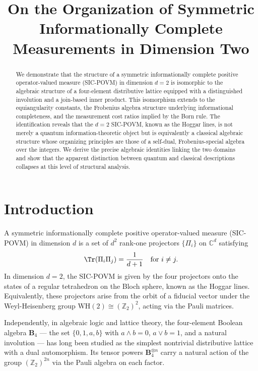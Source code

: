\documentclass{article}
\title{On the Organization of Symmetric Informationally Complete Measurements in Dimension Two}
\author{}
\date{}
\begin{document}
\maketitle

\begin{abstract}
We demonstrate that the structure of a symmetric informationally complete positive operator-valued measure (SIC-POVM) in dimension $d=2$ is isomorphic to the algebraic structure of a four-element distributive lattice equipped with a distinguished involution and a join-based inner product. This isomorphism extends to the equiangularity constants, the Frobenius algebra structure underlying informational completeness, and the measurement cost ratios implied by the Born rule. The identification reveals that the $d=2$ SIC-POVM, known as the Hoggar lines, is not merely a quantum information-theoretic object but is equivalently a classical algebraic structure whose organizing principles are those of a self-dual, Frobenius-special algebra over the integers. We derive the precise algebraic identities linking the two domains and show that the apparent distinction between quantum and classical descriptions collapses at this level of structural analysis.
\end{abstract}

\section{Introduction}

A symmetric informationally complete positive operator-valued measure (SIC-POVM) in dimension $d$ is a set of $d^2$ rank-one projectors $\{\Pi_i\}$ on $\mathbb{C}^d$ satisfying
\begin{equation}
\Tr(\Pi_i \Pi_j) = \frac{1}{d+1} \quad \text{for } i \neq j.
\end{equation}
In dimension $d=2$, the SIC-POVM is given by the four projectors onto the states of a regular tetrahedron on the Bloch sphere, known as the Hoggar lines. Equivalently, these projectors arise from the orbit of a fiducial vector under the Weyl-Heisenberg group $\mathrm{WH}(2) \cong (\mathbb{Z}_2)^2$, acting via the Pauli matrices.

Independently, in algebraic logic and lattice theory, the four-element Boolean algebra $\mathbf{B}_4$ — the set $\{0, 1, a, b\}$ with $a \wedge b = 0$, $a \vee b = 1$, and a natural involution — has long been studied as the simplest nontrivial distributive lattice with a dual automorphism. Its tensor powers $\mathbf{B}_4^{\otimes n}$ carry a natural action of the group $(\mathbb{Z}_2)^{2n}$ via the Pauli algebra on each factor.
\end{document}
